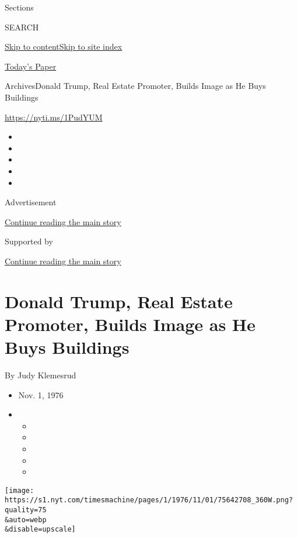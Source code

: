 Sections

SEARCH

\protect\hyperlink{site-content}{Skip to
content}\protect\hyperlink{site-index}{Skip to site index}

\href{https://myaccount.nytimes.com/auth/login?response_type=cookie\&client_id=vi}{}

\href{https://www.nytimes.com/section/todayspaper}{Today's Paper}

Archives\textbar{}Donald Trump, Real Estate Promoter, Builds Image as He
Buys Buildings

\url{https://nyti.ms/1PudYUM}

\begin{itemize}
\item
\item
\item
\item
\item
\end{itemize}

Advertisement

\protect\hyperlink{after-top}{Continue reading the main story}

Supported by

\protect\hyperlink{after-sponsor}{Continue reading the main story}

\hypertarget{donald-trump-real-estate-promoter-builds-image-as-he-buys-buildings}{%
\section{Donald Trump, Real Estate Promoter, Builds Image as He Buys
Buildings}\label{donald-trump-real-estate-promoter-builds-image-as-he-buys-buildings}}

By Judy Klemesrud

\begin{itemize}
\item
  Nov. 1, 1976
\item
  \begin{itemize}
  \item
  \item
  \item
  \item
  \item
  \end{itemize}
\end{itemize}

\texttt{[image: https://s1.nyt.com/timesmachine/pages/1/1976/11/01/75642708\_360W.png?quality=75\\\&auto=webp\\\&disable=upscale]}

